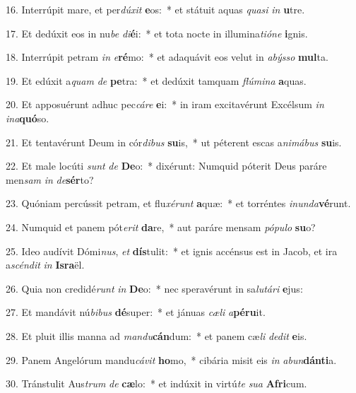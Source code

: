 16. Interrúpit mare, et per\textit{dú}\textit{xit} \textbf{e}os:~*  et státuit aquas \textit{qua}\textit{si} \textit{in} \textbf{u}tre.\

17. Et dedúxit eos in nu\textit{be} \textit{di}\textbf{é}i:~*  et tota nocte in illumina\textit{ti}\textit{ó}\textit{ne} \textbf{i}gnis.\

18. Interrúpit petram \textit{in} \textit{e}\textbf{ré}mo:~*  et adaquávit eos velut in \textit{a}\textit{býs}\textit{so} \textbf{mul}ta.\

19. Et edúxit a\textit{quam} \textit{de} \textbf{pe}tra:~*  et dedúxit tamquam \textit{flú}\textit{mi}\textit{na} \textbf{a}quas.\

20. Et apposuérunt adhuc pec\textit{cá}\textit{re} \textbf{e}i:~*  in iram excitavérunt Excélsum \textit{in} \textit{in}\textit{a}\textbf{quó}so.\

21. Et tentavérunt Deum in cór\textit{di}\textit{bus} \textbf{su}is,~*  ut péterent escas a\textit{ni}\textit{má}\textit{bus} \textbf{su}is.\

22. Et male locúti \textit{sunt} \textit{de} \textbf{De}o:~*  dixérunt: Numquid póterit Deus paráre men\textit{sam} \textit{in} \textit{de}\textbf{sér}to?\

23. Quóniam percússit petram, et flu\textit{xé}\textit{runt} \textbf{a}quæ:~*  et torréntes \textit{in}\textit{un}\textit{da}\textbf{vé}runt.\

24. Numquid et panem pót\textit{e}\textit{rit} \textbf{da}re,~*  aut paráre mensam \textit{pó}\textit{pu}\textit{lo} \textbf{su}o?\

25. Ideo audívit Dómi\textit{nus}, \textit{et} \textbf{dís}tulit:~*  et ignis accénsus est in Jacob, et ira a\textit{scén}\textit{dit} \textit{in} \textbf{Is}\textbf{ra}ël.\

26. Quia non credidé\textit{runt} \textit{in} \textbf{De}o:~*  nec speravérunt in sa\textit{lu}\textit{tá}\textit{ri} \textbf{e}jus:\

27. Et mandávit nú\textit{bi}\textit{bus} \textbf{dé}super:~*  et jánuas \textit{cæ}\textit{li} \textit{a}\textbf{pé}\textbf{ru}it.\

28. Et pluit illis manna ad \textit{man}\textit{du}\textbf{cán}dum:~*  et panem cæ\textit{li} \textit{de}\textit{dit} \textbf{e}is.\

29. Panem Angelórum mandu\textit{cá}\textit{vit} \textbf{ho}mo,~*  cibária misit eis \textit{in} \textit{ab}\textit{un}\textbf{dán}\textbf{ti}a.\

30. Tránstulit Aus\textit{trum} \textit{de} \textbf{cæ}lo:~*  et indúxit in virtú\textit{te} \textit{su}\textit{a} \textbf{A}\textbf{fri}cum.\

